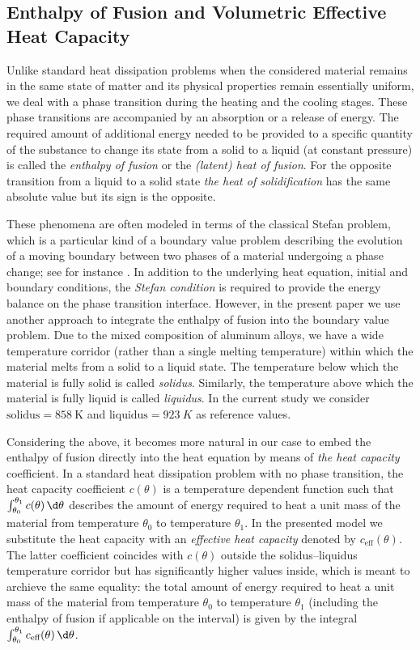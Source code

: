 \subsection{Enthalpy of Fusion and Volumetric Effective Heat Capacity}
\label{subsec:capacity}

Unlike standard heat dissipation problems when the considered material remains in the same state of matter and its physical properties remain essentially uniform, we deal with a phase transition during the heating and the cooling stages.
These phase transitions are accompanied by an absorption or a release of energy. 
The required amount of additional energy needed to be provided to a specific quantity of the substance to change its state from a solid to a liquid (at constant pressure) is called the \emph{enthalpy of fusion} or the \emph{(latent) heat of fusion}. 
For the opposite transition from a liquid to a solid state \emph{the heat of solidification} has the same absolute value but its sign is the opposite.

These phenomena are often modeled in terms of the classical Stefan problem, which is a particular kind of a boundary value problem describing the evolution of a moving boundary between two phases of a material undergoing a phase change; see for instance \cite{Gupta:2003:1}. 
In addition to the underlying heat equation, initial and boundary conditions, the \emph{Stefan condition} is required to provide the energy balance on the phase transition interface.
However, in the present paper we use another approach to integrate the enthalpy of fusion into the boundary value problem. 
Due to the mixed composition of aluminum alloys, we have a wide temperature corridor (rather than a single melting temperature) within which the material melts from a solid to a liquid state. 
The temperature below which the material is fully solid is called \emph{solidus}. 
Similarly, the temperature above which the material is fully liquid is called \emph{liquidus}. 
In the current study we consider $\text{solidus} = \SI{858}{\K}$ and $\text{liquidus} = \SI{923}{K}$ as reference values.

Considering the above, it becomes more natural in our case to embed the enthalpy of fusion directly into the heat equation by means of \emph{the heat capacity} coefficient. 
In a standard heat dissipation problem with no phase transition, the heat capacity coefficient $c(\theta)$ is a temperature dependent function such that $\int_{\theta_0}^{\theta_1} c(\theta) \, \d\theta$ describes the amount of energy required to heat a unit mass of the material from temperature $\theta_0$ to temperature $\theta_1$. 
In the presented model we substitute the heat capacity with an \emph{effective heat capacity} denoted by $c_{\text{eff}}(\theta)$. 
The latter coefficient coincides with $c(\theta)$ outside the solidus--liquidus temperature corridor but has significantly higher values inside, which is meant to archieve the same equality: the total amount of energy required to heat a unit mass of the material from temperature $\theta_0$ to temperature $\theta_1$ (including the enthalpy of fusion if applicable on the interval) is given by the integral $\int_{\theta_0}^{\theta_1} c_{\text{eff}}(\theta) \, \d\theta$.

